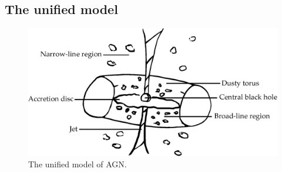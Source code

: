     \subsection{The unified model}
    \label{sec:unified-model}

        \begin{figure}
            \centering
            \includegraphics[width=\textwidth]{images/agn.eps}
            \caption{\label{fig:agn} The unified model of AGN.}
        \end{figure}

